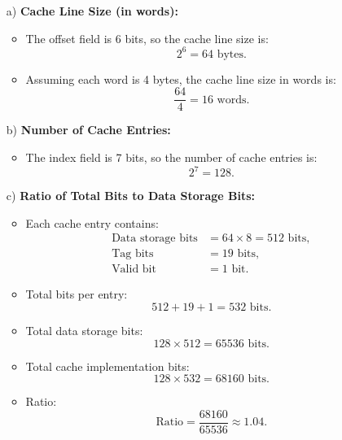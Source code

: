\documentclass[cn,12pt]{homework}
\begin{document}
\begin{solution}

\begin{enumerate}
    \item[a)] \textbf{Cache Line Size (in words):}
    \begin{itemize}
        \item The offset field is 6 bits, so the cache line size is:
        \[
        2^6 = 64 \text{ bytes}.
        \]
        \item Assuming each word is 4 bytes, the cache line size in words is:
        \[
        \frac{64}{4} = 16 \text{ words}.
        \]
    \end{itemize}
    
    \item[b)] \textbf{Number of Cache Entries:}
    \begin{itemize}
        \item The index field is 7 bits, so the number of cache entries is:
        \[
        2^7 = 128.
        \]
    \end{itemize}
    
    \item[c)] \textbf{Ratio of Total Bits to Data Storage Bits:}
    \begin{itemize}
        \item Each cache entry contains:
        \begin{align*}
        \text{Data storage bits} & = 64 \times 8 = 512 \text{ bits}, \\
        \text{Tag bits} & = 19 \text{ bits}, \\
        \text{Valid bit} & = 1 \text{ bit}.
        \end{align*}
        \item Total bits per entry:
        \[
        512 + 19 + 1 = 532 \text{ bits}.
        \]
        \item Total data storage bits:
        \[
        128 \times 512 = 65536 \text{ bits}.
        \]
        \item Total cache implementation bits:
        \[
        128 \times 532 = 68160 \text{ bits}.
        \]
        \item Ratio:
        \[
        \text{Ratio} = \frac{68160}{65536} \approx 1.04.
        \]
    \end{itemize}
\end{enumerate}

\end{solution}
\newpage
\end{document}
